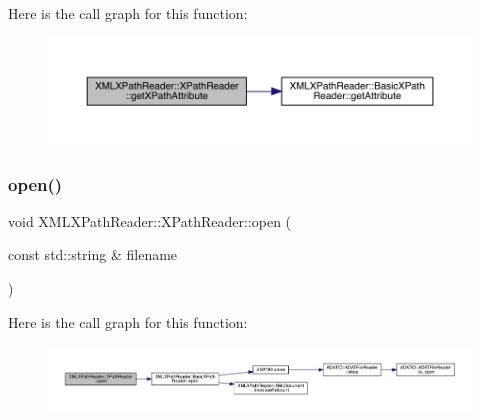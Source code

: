Here is the call graph for this function\+:
\nopagebreak
\begin{figure}[H]
\begin{center}
\leavevmode
\includegraphics[width=350pt]{d3/d5a/classXMLXPathReader_1_1XPathReader_a0a5ca67826c2c8fdad784a3bbbba4b3c_cgraph}
\end{center}
\end{figure}
\mbox{\label{classXMLXPathReader_1_1XPathReader_aa6e237582bcd20389d60cb29a879890c}} 
\subsubsection{\texorpdfstring{open()}{open()}\hspace{0.1cm}{\footnotesize\ttfamily [1/9]}}
{\footnotesize\ttfamily void X\+M\+L\+X\+Path\+Reader\+::\+X\+Path\+Reader\+::open (\begin{DoxyParamCaption}\item[{const std\+::string \&}]{filename }\end{DoxyParamCaption})\hspace{0.3cm}{\ttfamily [inline]}}

Here is the call graph for this function\+:
\nopagebreak
\begin{figure}[H]
\begin{center}
\leavevmode
\includegraphics[width=350pt]{d3/d5a/classXMLXPathReader_1_1XPathReader_aa6e237582bcd20389d60cb29a879890c_cgraph}
\end{center}
\end{figure}
\mbox{\label{classXMLXPathReader_1_1XPathReader_aa6e237582bcd20389d60cb29a879890c}} 
